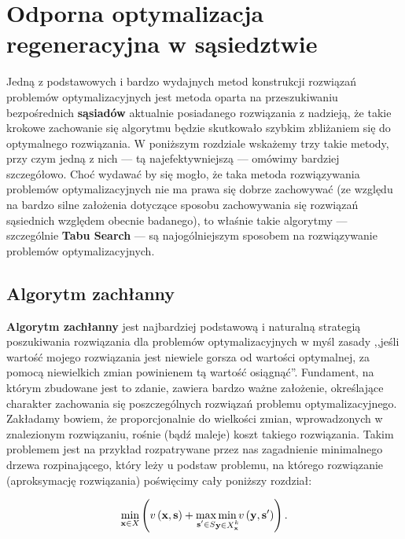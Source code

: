 \chapter{Odporna optymalizacja regeneracyjna w sąsiedztwie}\label{ch:localSearch}
\thispagestyle{chapterBeginStyle}

Jedną z podstawowych i bardzo wydajnych metod konstrukcji rozwiązań problemów optymalizacyjnych jest metoda oparta na przeszukiwaniu bezpośrednich \textbf{sąsiadów} aktualnie posiadanego rozwiązania z nadzieją, że takie krokowe zachowanie się algorytmu będzie skutkowało szybkim zbliżaniem się do optymalnego rozwiązania. W poniższym rozdziale wskażemy trzy takie metody, przy czym jedną z nich --- tą najefektywniejszą --- omówimy bardziej szczegółowo. Choć wydawać by się mogło, że taka metoda rozwiązywania problemów optymalizacyjnych nie ma prawa się dobrze zachowywać (ze względu na bardzo silne założenia dotyczące sposobu zachowywania się rozwiązań sąsiednich względem obecnie badanego), to właśnie takie algorytmy --- szczególnie \textbf{Tabu Search} --- są najogólniejszym sposobem na rozwiązywanie problemów optymalizacyjnych.

\section{Algorytm zachłanny}

\textbf{Algorytm zachłanny} jest najbardziej podstawową i naturalną strategią poszukiwania rozwiązania dla problemów optymalizacyjnych w myśl zasady ,,jeśli wartość mojego rozwiązania jest niewiele gorsza od wartości optymalnej, za pomocą niewielkich zmian powinienem tą wartość osiągnąć''. Fundament, na którym zbudowane jest to zdanie, zawiera bardzo ważne założenie, określające charakter zachowania się poszczególnych rozwiązań problemu optymalizacyjnego. Zakładamy bowiem, że proporcjonalnie do wielkości zmian, wprowadzonych w znalezionym rozwiązaniu, rośnie (bądź maleje) koszt takiego rozwiązania. Takim problemem jest na przykład rozpatrywane przez nas zagadnienie minimalnego drzewa rozpinającego, który leży u podstaw problemu, na którego rozwiązanie (aproksymację rozwiązania) poświęcimy cały poniższy rozdział:

\begin{equation}\label{eq:rrimst}
\min_{\mathclap{\textbf{x} \in X}} \left( v \left( \textbf{x}, \textbf{s} \right) + \max_{\mathclap{\textbf{s}^{\prime} \in S}} \min_{\mathclap{\textbf{y} \in X^{k}_{\textbf{x}}}} v \left( \textbf{y}, \textbf{s}^{\prime} \right) \right)\text{.}
\end{equation}
\vspace*{-20pt}

